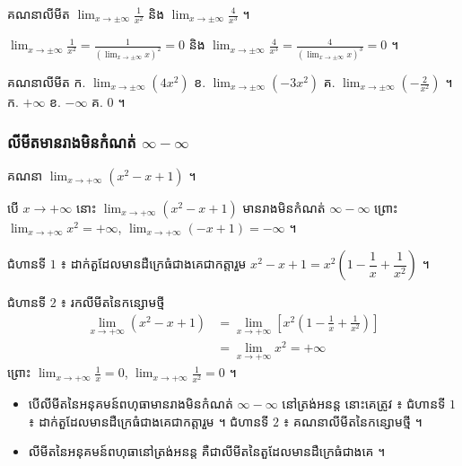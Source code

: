 \begin{example}[លំហាត់គំរូ ២]
គណនាលីមីត $\displaystyle\lim_{x \to \pm\infty}\frac{1}{x^2}$ និង $\displaystyle\lim_{x \to \pm\infty}\frac{4}{x^3}$ ។
\end{example}
\ans
$\displaystyle\lim_{x \to \pm\infty}\frac{1}{x^2} = \frac{1}{\left(\lim_{x \to \pm\infty} x\right)^2} = 0$ និង $\displaystyle\lim_{x \to \pm\infty}\frac{4}{x^3} = \frac{4}{\left(\lim_{x \to \pm\infty} x\right)^3} = 0$ ។

\begin{pro}
គណនាលីមីត \quad ក. $\displaystyle\lim_{x \to \pm\infty}(4x^2)$ \quad ខ. $\displaystyle\lim_{x \to \pm\infty}(-3x^2)$ \quad គ. $\displaystyle\lim_{x \to \pm\infty}\left(-\frac{2}{x^2}\right)$ ។
\ans
ក. $+\infty$ \quad ខ. $-\infty$ \quad គ. $0$ ។
\end{pro}

\subsubsection{លីមីតមានរាងមិនកំណត់ \texorpdfstring{$\infty - \infty$}{inf - inf}}

\begin{example}[ឧទាហរណ៍]
គណនា $\displaystyle\lim_{x \to +\infty}(x^2 - x + 1)$ ។
\end{example}
បើ $x \to +\infty$ នោះ $\displaystyle\lim_{x \to +\infty}(x^2 - x + 1)$ មានរាងមិនកំណត់ $\infty - \infty$ ព្រោះ $\displaystyle\lim_{x \to +\infty} x^2 = +\infty$, $\displaystyle\lim_{x \to +\infty}(-x + 1) = -\infty$ ។

ជំហានទី $1$ ៖ ដាក់តួដែលមានដឺក្រេធំជាងគេជាកត្តារួម $x^2 - x + 1 = x^2\left(1 - \dfrac{1}{x} + \dfrac{1}{x^2}\right)$ ។

ជំហានទី $2$ ៖ រកលីមីតនៃកន្សោមថ្មី
\[
\begin{aligned}
\lim_{x \to +\infty}(x^2 - x + 1) &= \lim_{x \to +\infty}\left[x^2\left(1 - \frac{1}{x} + \frac{1}{x^2}\right)\right]\\
&= \lim_{x \to +\infty} x^2 = +\infty
\end{aligned}
\]
ព្រោះ $\displaystyle\lim_{x \to +\infty}\frac{1}{x} = 0$, $\displaystyle\lim_{x \to +\infty}\frac{1}{x^2} = 0$ ។

\begin{formulaBox}[ជាទូទៅ]
\begin{itemize}
  \item បើលីមីតនៃអនុគមន៍ពហុធាមានរាងមិនកំណត់ $\infty - \infty$ នៅត្រង់អនន្ត នោះគេត្រូវ ៖ ជំហានទី $1$ ៖ ដាក់តួដែលមានដឺក្រេធំជាងគេជាកត្តារួម ។ ជំហានទី $2$ ៖ គណនាលីមីតនៃកន្សោមថ្មី ។
  \item លីមីតនៃអនុគមន៍ពហុធានៅត្រង់អនន្ត គឺជាលីមីតនៃតួដែលមានដឺក្រេធំជាងគេ ។
\end{itemize}
\end{formulaBox}

